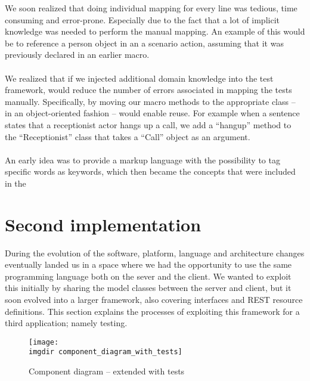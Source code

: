 We soon realized that doing individual mapping for every line was tedious, time consuming and error-prone. Especially due to the fact that a lot of implicit knowledge was needed to perform the manual mapping. An example of this would be to reference a person object in an a scenario action, assuming that it was previously declared in an earlier macro.\\\\
We realized that if we injected additional domain knowledge into the test framework, would reduce the number of errors associated in mapping the tests manually. Specifically, by moving our macro methods to the appropriate class -- in an object-oriented fashion -- would enable reuse. For example when a sentence states that a receptionist actor hangs up a call, we add a ``hangup'' method to the  ``Receptionist'' class that takes a ``Call'' object as an argument.\\\\
An early idea was to provide a markup language with the possibility to tag specific words as keywords, which then became the concepts that were included in the 


\section{Second implementation}
During the evolution of the software, platform, language and architecture changes eventually landed us in a space where we had the opportunity to use the same programming language both on the sever and the client. We wanted to exploit this initially by sharing the model classes between the server and client, but it soon evolved into a larger framework, also covering interfaces and REST resource definitions. This section explains the processes of exploiting this framework for a third application; namely testing.

\begin{figure}
\centering
\texttt{[image: \\imgdir component\_diagram\_with\_tests]}
\caption{Component diagram -- extended with tests}
\label{fig:component_diagram_with_tests}
\end{figure}

